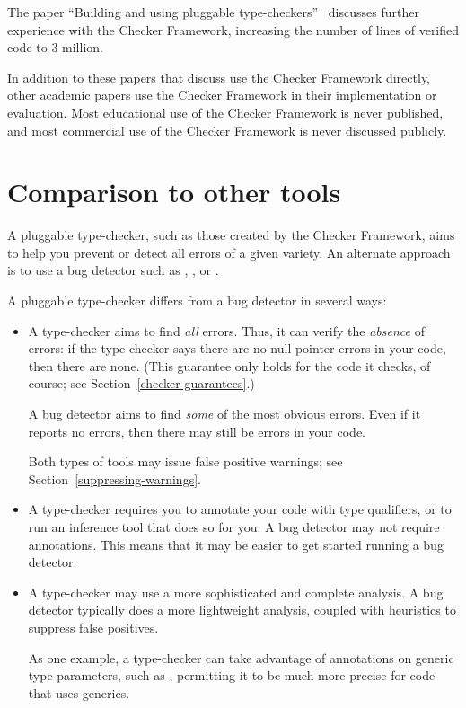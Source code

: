 The paper ``Building and using pluggable type-checkers''~\cite{DietlDEMS2011}
discusses further experience with the Checker Framework, increasing the
number of lines of verified code to 3 million.

In addition to these papers that discuss use the Checker Framework
directly, other academic papers use the Checker Framework in their
implementation or evaluation.  Most educational use of the Checker
Framework is never published, and most commercial use of the Checker
Framework is never discussed publicly.


\section{Comparison to other tools\label{other-tools}}

A pluggable type-checker, such as those created by the Checker Framework,
aims to help you prevent or detect all errors of a given variety.  An
alternate approach is to use a bug detector such as
,
, or
.

A pluggable type-checker
differs from a bug detector in several ways:
\begin{itemize}
\item
  A type-checker aims to find \emph{all} errors.  Thus, it can verify the
  \emph{absence} of errors:  if the type checker says there are no null
  pointer errors in your code, then there are none.  (This guarantee only
  holds for the code it checks, of course; see
  Section~\ref{checker-guarantees}.)

  A bug detector aims to find \emph{some} of the most obvious errors.  Even
  if it reports no errors, then there may still be errors in your code.

  Both types of tools may issue false positive warnings; see
  Section~\ref{suppressing-warnings}.

\item
  A type-checker requires you to annotate your code with type qualifiers,
  or to run an inference tool that does so for you.  A bug detector may not
  require annotations.  This means that it may be easier to get started
  running a bug detector.

\item
  A type-checker may use a more sophisticated and complete analysis.
  A bug detector typically does a more lightweight analysis, coupled with
  heuristics to suppress false positives.

  As one example, a type-checker can take advantage of annotations on
  generic type parameters, such as , permitting
  it to be much more precise for code that uses generics.

\end{itemize}

